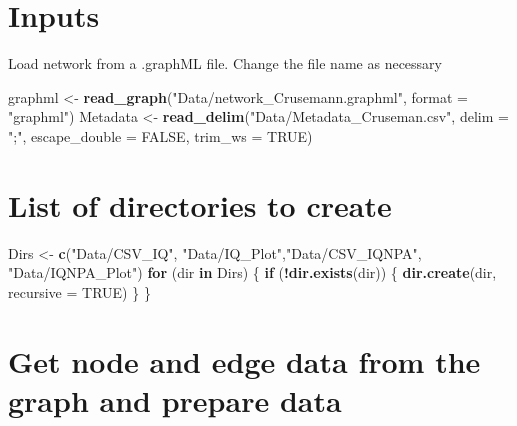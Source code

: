 \documentclass[
]{article}
\newenvironment{Shaded}{\begin{snugshade}}{\end{snugshade}}
\newcommand{\AttributeTok}[1]{\textcolor[rgb]{0.13,0.29,0.53}{#1}}
\newcommand{\ConstantTok}[1]{\textcolor[rgb]{0.56,0.35,0.01}{#1}}
\newcommand{\ControlFlowTok}[1]{\textcolor[rgb]{0.13,0.29,0.53}{\textbf{#1}}}
\newcommand{\FunctionTok}[1]{\textcolor[rgb]{0.13,0.29,0.53}{\textbf{#1}}}
\newcommand{\NormalTok}[1]{#1}
\newcommand{\OtherTok}[1]{\textcolor[rgb]{0.56,0.35,0.01}{#1}}
\newcommand{\SpecialCharTok}[1]{\textcolor[rgb]{0.81,0.36,0.00}{\textbf{#1}}}
\newcommand{\StringTok}[1]{\textcolor[rgb]{0.31,0.60,0.02}{#1}}
\begin{document}
\section{Inputs}\label{inputs}

Load network from a .graphML file. Change the file name as necessary

\begin{Shaded}
\begin{Highlighting}[]
\NormalTok{graphml }\OtherTok{\textless{}{-}} \FunctionTok{read\_graph}\NormalTok{(}\StringTok{"Data/network\_Crusemann.graphml"}\NormalTok{, }\AttributeTok{format =} \StringTok{"graphml"}\NormalTok{)}
\NormalTok{Metadata }\OtherTok{\textless{}{-}} \FunctionTok{read\_delim}\NormalTok{(}\StringTok{"Data/Metadata\_Cruseman.csv"}\NormalTok{, }
                       \AttributeTok{delim =} \StringTok{";"}\NormalTok{, }\AttributeTok{escape\_double =} \ConstantTok{FALSE}\NormalTok{, }\AttributeTok{trim\_ws =} \ConstantTok{TRUE}\NormalTok{)}
\end{Highlighting}
\end{Shaded}

\section{List of directories to
create}\label{list-of-directories-to-create}

\begin{Shaded}
\begin{Highlighting}[]
\NormalTok{Dirs }\OtherTok{\textless{}{-}} \FunctionTok{c}\NormalTok{(}\StringTok{"Data/CSV\_IQ"}\NormalTok{, }\StringTok{"Data/IQ\_Plot"}\NormalTok{,}\StringTok{"Data/CSV\_IQNPA"}\NormalTok{, }\StringTok{"Data/IQNPA\_Plot"}\NormalTok{)}
\ControlFlowTok{for}\NormalTok{ (dir }\ControlFlowTok{in}\NormalTok{ Dirs) \{}
  \ControlFlowTok{if}\NormalTok{ (}\SpecialCharTok{!}\FunctionTok{dir.exists}\NormalTok{(dir)) \{}
    \FunctionTok{dir.create}\NormalTok{(dir, }\AttributeTok{recursive =} \ConstantTok{TRUE}\NormalTok{)}
\NormalTok{  \}}
\NormalTok{\}}
\end{Highlighting}
\end{Shaded}

\section{Get node and edge data from the graph and prepare
data}\label{get-node-and-edge-data-from-the-graph-and-prepare-data}
\end{document}
